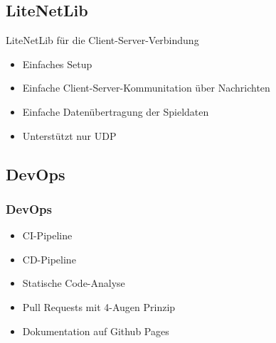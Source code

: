 \documentclass{beamer}
\begin{document}
\subsection{LiteNetLib}
\begin{frame}
  LiteNetLib für die Client-Server-Verbindung
  \begin{multicols}{2}
    \begin{itemize}
      \item Einfaches Setup
      \item Einfache Client-Server-Kommunitation über Nachrichten
      \item Einfache Datenübertragung der Spieldaten
    \end{itemize}
    \columnbreak
    \begin{itemize}
      \item Unterstützt nur UDP
    \end{itemize}
  \end{multicols}
\end{frame}


\subsection{DevOps}
\begin{frame}
\frametitle{DevOps}
  \begin{itemize}
    \item CI-Pipeline
    \item CD-Pipeline
    \item Statische Code-Analyse
    \item Pull Requests mit 4-Augen Prinzip
    \item Dokumentation auf Github Pages
  \end{itemize}
\end{frame}
\end{document}
